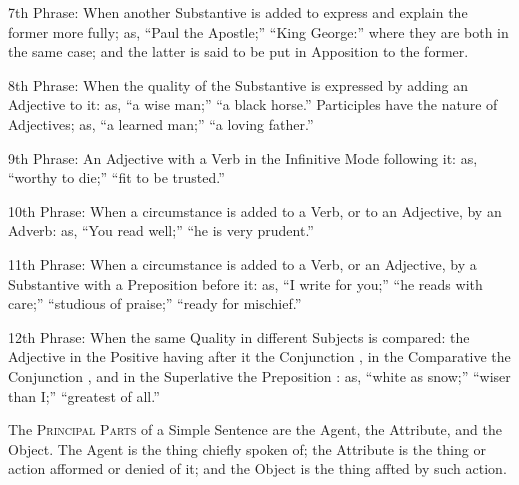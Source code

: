 7th Phrase: When another Substantive is added to express and explain the
former more fully; as, ``Paul the Apostle;'' ``King George:'' where they
are both in the same case; and the latter is said to be put in
Apposition to the former.

8th Phrase: When the quality of the Substantive is expressed by adding
an Adjective to it: as, ``a wise man;'' ``a black horse.'' Participles
have the nature of Adjectives; as, ``a learned man;'' ``a loving
father.''

9th Phrase: An Adjective with a Verb in the Infinitive Mode following
it: as, ``worthy to die;'' ``fit to be trusted.''

10th Phrase: When a circumstance is added to a Verb, or to an Adjective,
by an Adverb: as, ``You read well;'' ``he is very prudent.''

11th Phrase: When a circumstance is added to a Verb, or an Adjective, by
a Substantive with a Preposition before it: as, ``I write for you;''
``he reads with care;'' ``studious of praise;'' ``ready for mischief.''

12th Phrase: When the same Quality in different Subjects is compared:
the Adjective in the Positive having after it the Conjunction ,
in the Comparative the Conjunction , and in the Superlative the
Preposition : as, ``white as snow;'' ``wiser than I;'' ``greatest
of all.''

The \textsc{Principal Parts} of a Simple Sentence are the Agent, the
Attribute, and the Object. The Agent is the thing chiefly spoken of; the
Attribute is the thing or action afformed or denied of it; and the
Object is the thing affted by such action.


